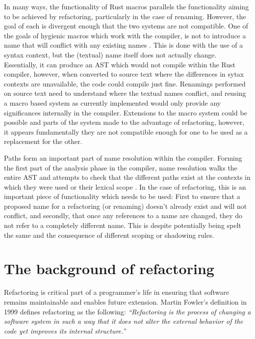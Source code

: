 In many ways, the functionality of Rust macros parallels the functionality aiming to be achieved by refactoring, particularly in the case of renaming. However, the goal of each is divergent enough that the two systems are not compatible. One of the goals of hygienic macros which work with the compiler, is not to introduce a name that will conflict with any existing names \cite{keep15}. This is done with the use of a syntax context, but the (textual) name itself does not actually change. Essentially, it can produce an AST which would not compile within the Rust compiler, however, when converted to source text where the differences in sytax contexts are unavailable, the code could compile just fine. Renamings performed on source text need to understand where the textual names conflict, and reusing a macro based system as currently implemented would only provide any significances internally in the compiler. Extensions to the macro system could be possible and parts of the system made to the advantage of refactoring, however, it appears fundamentally they are not compatible enough for one to be used as a replacement for the other.

Paths form an important part of name resolution within the compiler. Forming the first part of the analysis phase in the compiler, name resolution walks the entire AST and attempts to check that the different paths exist at the contexts in which they were used or their lexical scope \cite{driver15}. In the case of refactoring, this is an important piece of functionality which needs to be used: First to ensure that a proposed name for a refactoring (or renaming) doesn't already exist and will not conflict, and secondly, that once any references to a name are changed, they do not refer to a completely different name. This is despite potentially being spelt the same and the consequence of different scoping or shadowing rules.

\section{The background of refactoring}\label{S:refactorback}
Refactoring is critical part of a programmer's life in ensuring that software remains maintainable and enables future extension. Martin Fowler's definition in 1999 \cite{fowler99} defines refactoring as the following: \emph{``Refactoring is the process of changing a software system in such a way that it does not alter the external behavior of the code yet improves its internal structure.''}

